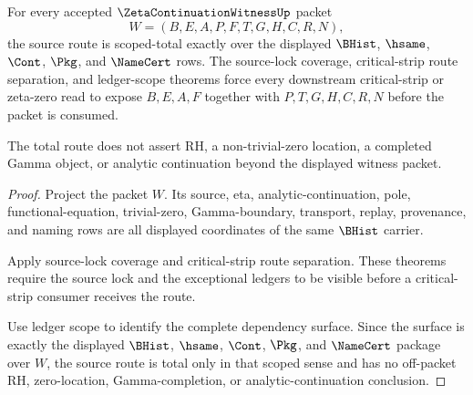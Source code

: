 \begin{theorem}
\label{thm:zeta-continuation-witness-source-route-scoped-totality}
For every accepted $\ZetaContinuationWitnessUp$ packet
$$
W=(B,E,A,P,F,T,G,H,C,R,N),
$$
the source route is scoped-total exactly over the displayed $\BHist$, $\hsame$, $\Cont$, $\Pkg$, and $\NameCert$ rows. The source-lock coverage, critical-strip route separation, and ledger-scope theorems force every downstream critical-strip or zeta-zero read to expose $B,E,A,F$ together with $P,T,G,H,C,R,N$ before the packet is consumed.

The total route does not assert RH, a non-trivial-zero location, a completed Gamma object, or analytic continuation beyond the displayed witness packet.
\end{theorem}
\begin{proof}
Project the packet $W$. Its source, eta, analytic-continuation, pole, functional-equation, trivial-zero, Gamma-boundary, transport, replay, provenance, and naming rows are all displayed coordinates of the same $\BHist$ carrier.

Apply source-lock coverage and critical-strip route separation. These theorems require the source lock and the exceptional ledgers to be visible before a critical-strip consumer receives the route.

Use ledger scope to identify the complete dependency surface. Since the surface is exactly the displayed $\BHist$, $\hsame$, $\Cont$, $\Pkg$, and $\NameCert$ package over $W$, the source route is total only in that scoped sense and has no off-packet RH, zero-location, Gamma-completion, or analytic-continuation conclusion.
\end{proof}

